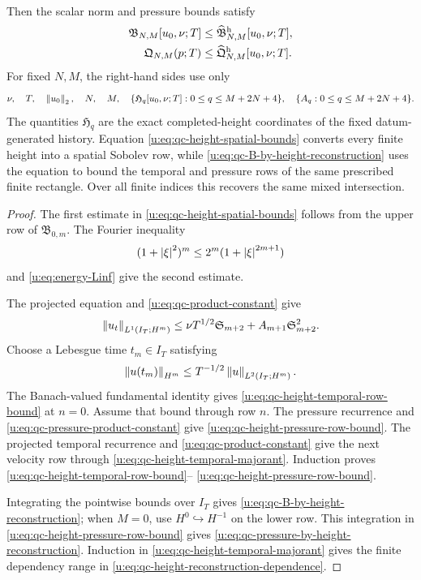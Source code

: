 \begin{proposition}
\begin{align}
\end{align}
Then the scalar norm and pressure bounds satisfy
\begin{align}
 \mathfrak B_{N,M}[u_0,\nu;T]
 &\le\widehat{\mathfrak B}_{N,M}^{\rm h}[u_0,\nu;T],
 \label{u:eq:qc-B-by-height-reconstruction}\\
 \mathfrak Q_{N,M}(p;T)
 &\le\widehat{\mathfrak Q}_{N,M}^{\rm h}[u_0,\nu;T].
 \label{u:eq:qc-pressure-by-height-reconstruction}
\end{align}
For fixed \(N,M\), the right-hand sides use only
\begin{equation}
 \nu,\quad T,\quad\left\lVert u_0\right\rVert_2,\quad N,\quad M,\quad
 \{\mathfrak H_q[u_0,\nu;T]:0\le q\le M+2N+4\},
 \quad\{A_q:0\le q\le M+2N+4\}.
 \label{u:eq:qc-height-reconstruction-dependence}
\end{equation}
The quantities \(\mathfrak H_q\) are the exact completed-height coordinates
of the fixed datum-generated history.  Equation
\eqref{u:eq:qc-height-spatial-bounds} converts every finite height into a spatial
Sobolev row, while \eqref{u:eq:qc-B-by-height-reconstruction} uses the equation
to bound the temporal and pressure rows of the same prescribed finite
rectangle.  Over all finite indices this recovers the same mixed intersection.
\end{proposition}

\begin{proof}
The first estimate in \eqref{u:eq:qc-height-spatial-bounds} follows from the
upper row of \(\mathfrak B_{0,m}\).  The Fourier inequality
\[
 (1+\left|\xi\right|^2)^m\le2^m(1+\left|\xi\right|^{2m+1})
\]
and \eqref{u:eq:energy-Linf} give the second estimate.

The projected equation and \eqref{u:eq:qc-product-constant} give
\[
 \left\lVert u_t\right\rVert_{L^1(I_T;H^m)}
 \le\nu T^{1/2}\mathfrak S_{m+2}
 +A_{m+1}\mathfrak S_{m+2}^2.
\]
Choose a Lebesgue time \(t_m\in I_T\) satisfying
\[
 \left\lVert u(t_m)\right\rVert_{H^m}
 \le T^{-1/2}\left\lVert u\right\rVert_{L^2(I_T;H^m)}.
\]
The Banach-valued fundamental identity gives
\eqref{u:eq:qc-height-temporal-row-bound} at \(n=0\).
Assume that bound through row \(n\).  The pressure recurrence and
\eqref{u:eq:qc-pressure-product-constant} give
\eqref{u:eq:qc-height-pressure-row-bound}.  The projected temporal recurrence
and \eqref{u:eq:qc-product-constant} give the next velocity row through
\eqref{u:eq:qc-height-temporal-majorant}.  Induction proves
\eqref{u:eq:qc-height-temporal-row-bound}--%
\eqref{u:eq:qc-height-pressure-row-bound}.

Integrating the pointwise bounds over \(I_T\) gives
\eqref{u:eq:qc-B-by-height-reconstruction}; when \(M=0\), use
\(H^0\hookrightarrow H^{-1}\) on the lower row.  This integration in
\eqref{u:eq:qc-height-pressure-row-bound} gives
\eqref{u:eq:qc-pressure-by-height-reconstruction}.  Induction in
\eqref{u:eq:qc-height-temporal-majorant} gives the finite dependency range in
\eqref{u:eq:qc-height-reconstruction-dependence}.
\end{proof}

